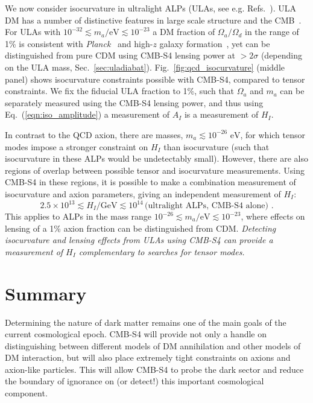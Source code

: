 We now consider isocurvature in ultralight ALPs (ULAs, see e.g. Refs.~\cite{Marsh:2013taa,Marsh:2014qoa}). ULA DM has a number of distinctive features in large scale structure and the CMB~\cite{Hlozek:2014lca,Marsh:2013ywa}. For ULAs with $10^{-32}\lesssim m_a/\text{eV}\lesssim 10^{-23}$ a DM fraction of $\Omega_a/\Omega_d$ in the range of 1\% is consistent with \emph{Planck}~\cite{Hlozek:2014lca} and high-$z$ galaxy formation~\cite{Bozek:2014uqa,Schive:2015kza}, yet can be distinguished from pure CDM using CMB-S4 lensing power at $>2\sigma$ (depending on the ULA mass, Sec.~\ref{sec:uladiabat}). Fig.~\ref{fig:qcd_isocurvature} (middle panel) shows isocurvature constraints possible with CMB-S4, compared to tensor constraints. We fix the fiducial ULA fraction to 1\%, such that $\Omega_a$ and $m_a$ can be separately measured using the CMB-S4 lensing power, and thus using Eq.~(\ref{eqn:iso_amplitude}) a measurement of $A_I$ is a measurement of $H_I$. 

In contrast to the QCD axion, there are masses, $m_a\lesssim 10^{-26}\text{ eV}$, for which tensor modes impose a stronger constraint on $H_I$ than isocurvature (such that isocurvature in these ALPs would be undetectably small). However, there are also regions of overlap between possible tensor and isocurvature measurements. Using CMB-S4 in these regions, it is possible to make a combination measurement of isocurvature and axion parameters, giving an independent measurement of $H_I$:
\begin{equation} 2.5\times 10^{13}\lesssim H_I/\text{GeV}\lesssim 10^{14}\,
\text{(ultralight ALPs, CMB-S4 alone)}\,\,.
\end{equation}
This applies to ALPs in the mass range $10^{-26}\lesssim m_a/\text{eV}\lesssim 10^{-23}$, where effects on lensing of a 1\% axion fraction can be distinguished from CDM. \emph{Detecting isocurvature and lensing effects from ULAs using CMB-S4 can provide a measurement of $H_I$ complementary to searches for tensor modes.}%

\section{Summary}
Determining the nature of dark matter remains one of the main goals of the current cosmological epoch. CMB-S4 will provide not only a handle on distinguishing between different models of DM annihilation and other models of DM interaction, but will also place extremely tight constraints on axions and axion-like particles. This will allow CMB-S4 to probe the dark sector and reduce the boundary of ignorance on (or detect!) this important cosmological component.

